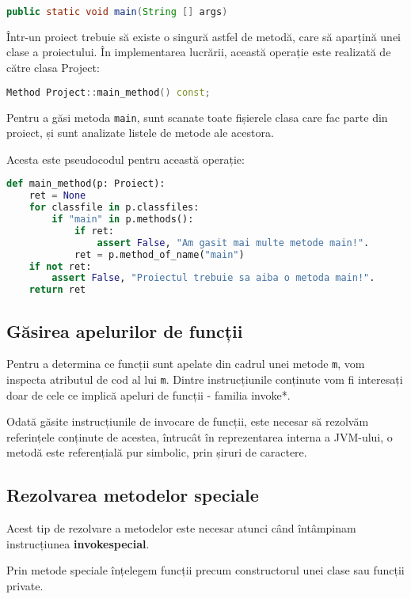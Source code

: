 \begin{lstlisting}[language=Java]
public static void main(String [] args)
\end{lstlisting}

Într-un proiect trebuie să existe o singură astfel de metodă, care să aparțină
unei clase a proiectului.
În implementarea lucrării, această operație este realizată de
către clasa Project:
\begin{lstlisting}[language=C++]
Method Project::main_method() const;
\end{lstlisting}

Pentru a găsi metoda \texttt{main}, sunt scanate toate fișierele
clasa care fac parte din proiect, și sunt analizate listele de
metode ale acestora.

Acesta este pseudocodul pentru această operație:
\begin{lstlisting}[language=Python]
def main_method(p: Proiect):
    ret = None
    for classfile in p.classfiles:
        if "main" in p.methods():
            if ret:
                assert False, "Am gasit mai multe metode main!".
            ret = p.method_of_name("main")
    if not ret:
        assert False, "Proiectul trebuie sa aiba o metoda main!".
    return ret
\end{lstlisting}

\subsection{Găsirea apelurilor de funcții}

Pentru a determina ce funcții sunt apelate din cadrul unei metode \texttt{m},
vom inspecta atributul de cod al lui \texttt{m}.
Dintre instrucțiunile conținute vom fi interesați doar de cele ce implică
apeluri de funcții - familia invoke*.

Odată găsite instrucțiunile de invocare de funcții, este necesar să rezolvăm
referințele conținute de acestea, întrucât în reprezentarea interna a JVM-ului,
o metodă este referențială pur simbolic, prin șiruri de caractere.

\subsection{Rezolvarea metodelor speciale}

Acest tip de rezolvare a metodelor este necesar atunci când întâmpinam
instrucțiunea \textbf{invokespecial}.

Prin metode speciale înțelegem funcții precum constructorul unei clase sau
funcții private.

